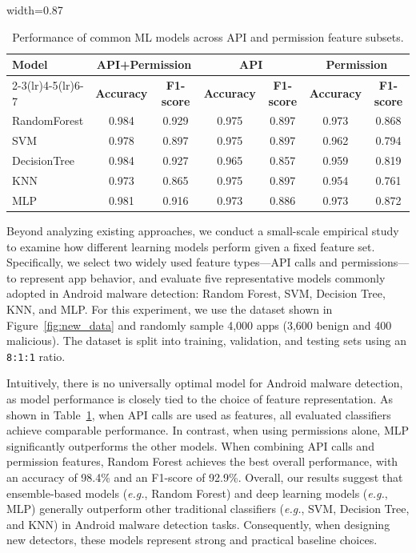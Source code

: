 \begin{table}[ht]
  \centering
  \caption{Performance of common ML models across API and permission feature subsets.}
  \vspace{-0.2cm}
  \label{tab:model_comparison}
  \begin{adjustbox}{width=0.87\linewidth}
    \begin{tabular}{lcccccc}
      \toprule
      \multirow{2}{*}{\textbf{Model}} &
        \multicolumn{2}{c}{\textbf{API+Permission}} &
        \multicolumn{2}{c}{\textbf{API}} &
        \multicolumn{2}{c}{\textbf{Permission}} \\
      \cmidrule(lr){2-3}\cmidrule(lr){4-5}\cmidrule(lr){6-7}
      & \textbf{Accuracy} & \textbf{F1-score} & \textbf{Accuracy} & \textbf{F1-score} & \textbf{Accuracy} & \textbf{F1-score} \\
      \midrule
      RandomForest & 0.984 & 0.929 & 0.975 & 0.897 & 0.973 & 0.868 \\
      SVM          & 0.978 & 0.897 & 0.975 & 0.897 & 0.962 & 0.794 \\
      DecisionTree & 0.984 & 0.927 & 0.965 & 0.857 & 0.959 & 0.819 \\
      KNN          & 0.973 & 0.865 & 0.975 & 0.897 & 0.954 & 0.761 \\
      MLP          & 0.981 & 0.916 & 0.973 & 0.886 & 0.973 & 0.872 \\
      \bottomrule
    \end{tabular}
  \end{adjustbox}
  \vspace{-0.4cm}
\end{table}

Beyond analyzing existing approaches, we conduct a small-scale empirical study to examine how different learning models perform given a fixed feature set. Specifically, we select two widely used feature types—API calls and permissions—to represent app behavior, and evaluate five representative models commonly adopted in Android malware detection: Random Forest, SVM, Decision Tree, KNN, and MLP.
For this experiment, we use the dataset shown in Figure~\ref{fig:new_data} and randomly sample 4,000 apps (3,600 benign and 400 malicious). The dataset is split into training, validation, and testing sets using an \texttt{8:1:1} ratio.

Intuitively, there is no universally optimal model for Android malware detection, as model performance is closely tied to the choice of feature representation. As shown in Table~\ref{tab:model_comparison}, when API calls are used as features, all evaluated classifiers achieve comparable performance. In contrast, when using permissions alone, MLP significantly outperforms the other models. When combining API calls and permission features, Random Forest achieves the best overall performance, with an accuracy of 98.4\% and an F1-score of 92.9\%.
Overall, our results suggest that ensemble-based models (\textit{e.g.}, Random Forest) and deep learning models (\textit{e.g.}, MLP) generally outperform other traditional classifiers (\textit{e.g.}, SVM, Decision Tree, and KNN) in Android malware detection tasks. Consequently, when designing new detectors, these models represent strong and practical baseline choices.




